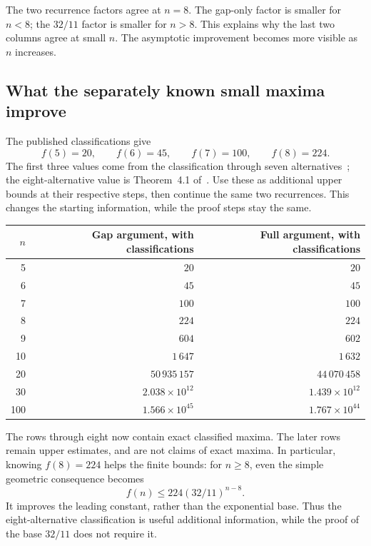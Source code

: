 The two recurrence factors agree at \(n=8\). The gap-only factor
is smaller for \(n<8\); the \(32/11\) factor is smaller for \(n>8\).
This explains why the last two columns agree at small \(n\).
The asymptotic improvement becomes more visible as \(n\) increases.

\subsection{What the separately known small maxima improve}
The published classifications give
\[
 f(5)=20,\qquad f(6)=45,\qquad f(7)=100,\qquad f(8)=224.
\]
The first three values come from the classification through seven
alternatives~\cite{smallcd}; the eight-alternative value is
Theorem~4.1 of~\cite{eightcd}. Use these as additional upper bounds
at their respective steps, then continue the same two recurrences.
This changes the starting information, while the proof steps stay the same.

\begin{center}\small
\renewcommand{\arraystretch}{1.18}
\begin{tabular}{@{}rrr@{}}\toprule
\(n\)&Gap argument, with classifications&Full argument, with classifications\\\midrule
5&$20$&$20$\\
6&$45$&$45$\\
7&$100$&$100$\\
8&$224$&$224$\\
9&$604$&$602$\\
10&$1\,647$&$1\,632$\\
20&$50\,935\,157$&$44\,070\,458$\\
30&$2.038\times10^{12}$&$1.439\times10^{12}$\\
100&$1.566\times10^{45}$&$1.767\times10^{44}$\\
\bottomrule\end{tabular}
\end{center}
The rows through eight now contain exact classified maxima. The
later rows remain upper estimates, and are not claims of exact maxima.
In particular, knowing \(f(8)=224\) helps the finite bounds: for
\(n\geq8\), even the simple geometric consequence becomes
\[
 f(n)\leq224(32/11)^{n-8}.
\]
It improves the leading constant, rather than the exponential base.
Thus the eight-alternative classification is useful additional
information, while the proof of the base \(32/11\) does not require it.

